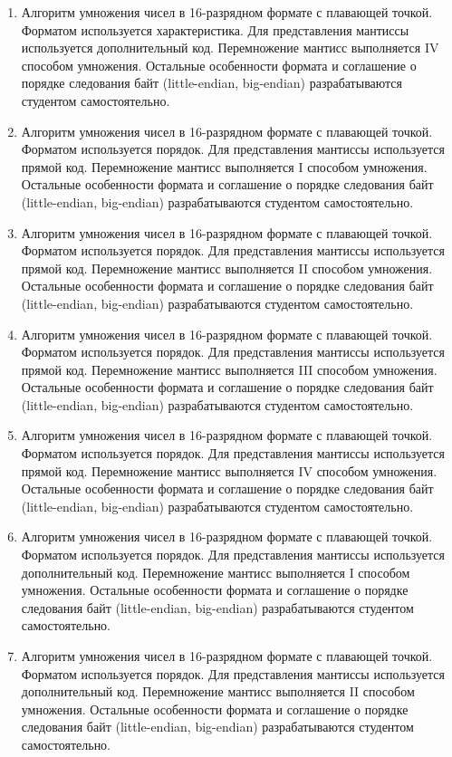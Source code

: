 \begin{enumerate}
    \item Алгоритм умножения чисел в 16-разрядном формате с плавающей точкой. Форматом используется характеристика. Для представления мантиссы используется дополнительный код. Перемножение мантисс выполняется IV способом умножения. Остальные особенности формата и соглашение о порядке следования байт (little-endian, big-endian) разрабатываются студентом самостоятельно.
    \item Алгоритм умножения чисел в 16-разрядном формате с плавающей точкой. Форматом используется порядок. Для представления мантиссы используется прямой код. Перемножение мантисс выполняется I способом умножения. Остальные особенности формата и соглашение о порядке следования байт (little-endian, big-endian) разрабатываются студентом самостоятельно.
    \item Алгоритм умножения чисел в 16-разрядном формате с плавающей точкой. Форматом используется порядок. Для представления мантиссы используется прямой код. Перемножение мантисс выполняется II способом умножения. Остальные особенности формата и соглашение о порядке следования байт (little-endian, big-endian) разрабатываются студентом самостоятельно.
    \item Алгоритм умножения чисел в 16-разрядном формате с плавающей точкой. Форматом используется порядок. Для представления мантиссы используется прямой код. Перемножение мантисс выполняется III способом умножения. Остальные особенности формата и соглашение о порядке следования байт (little-endian, big-endian) разрабатываются студентом самостоятельно.
    \item Алгоритм умножения чисел в 16-разрядном формате с плавающей точкой. Форматом используется порядок. Для представления мантиссы используется прямой код. Перемножение мантисс выполняется IV способом умножения. Остальные особенности формата и соглашение о порядке следования байт (little-endian, big-endian) разрабатываются студентом самостоятельно.
    \item Алгоритм умножения чисел в 16-разрядном формате с плавающей точкой. Форматом используется порядок. Для представления мантиссы используется дополнительный код. Перемножение мантисс выполняется I способом умножения. Остальные особенности формата и соглашение о порядке следования байт (little-endian, big-endian) разрабатываются студентом самостоятельно.
    \item Алгоритм умножения чисел в 16-разрядном формате с плавающей точкой. Форматом используется порядок. Для представления мантиссы используется дополнительный код. Перемножение мантисс выполняется II способом умножения. Остальные особенности формата и соглашение о порядке следования байт (little-endian, big-endian) разрабатываются студентом самостоятельно.

\end{enumerate}

